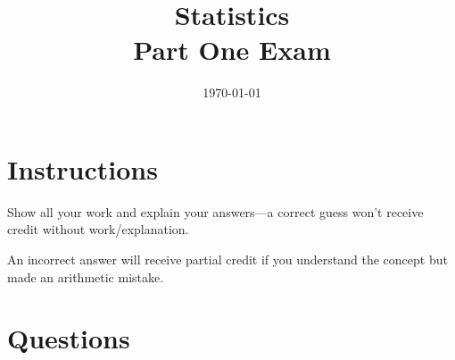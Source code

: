 \documentclass[letterpaper, landscape]{exam}
\title{Statistics \\ Part One Exam}
\date{\today}
\author{}
\begin{document}
  \maketitle


  \ifprintanswers{}
  \else
  \section{Instructions}
  Show all your work and explain your answers---a correct guess won't receive credit without
  work/explanation. 
  
  An incorrect answer will receive partial credit if you understand the
  concept but made an arithmetic mistake.

  \fi

  \section{Questions}
\end{document}
